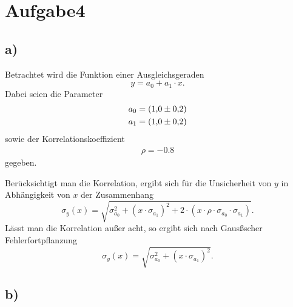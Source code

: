 \newpage
\section{Aufgabe4}
\label{sec:a4}

\subsection{a)}
\label{subsec:a4a}
 Betrachtet wird die Funktion einer
 Ausgleichsgeraden
 \\
 \begin{equation}
   \label{eqn:f}
   y = a_{0} + a_{1} \cdot x.
 \end{equation}
 Dabei seien die Parameter
 \\
 \begin{align*}
   a_{0} &= \SI{1.0+-0.2}{}\\
   a_{1} &= \SI{1.0+-0.2}{}
 \end{align*}
 sowie der Korrelationskoeffizient
 \\
 \begin{align*}
   \rho = -0.8
 \end{align*}
gegeben.

Berücksichtigt man die Korrelation,
ergibt sich für die Unsicherheit von $y$
in Abhängigkeit von $x$ der Zusammenhang
\\
\begin{equation}
  \label{eqn:korr}
  \sigma_{y}(x) = \sqrt{\sigma_{a_{0}}^{2} + \left( x \cdot \sigma_{a_{1}} \right)^{2}
  + 2 \cdot \left( x \cdot \rho \cdot \sigma_{a_{0}} \cdot \sigma_{a_{1}} \right)}.
\end{equation}
Lässt man die Korrelation außer acht, so ergibt sich nach Gausßscher Fehlerfortpflanzung
\\
\begin{equation}
  \label{eqn:unkorr}
  \sigma_{y}(x) = \sqrt{\sigma_{a_{0}}^{2} + \left( x \cdot \sigma_{a_{1}} \right)^{2}}.
\end{equation}


\subsection{b)}
\label{subsec:a4b}

